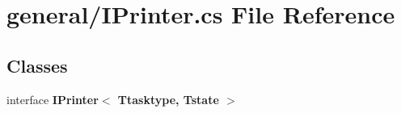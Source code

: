 \section{general/\-I\-Printer.cs File Reference}
\label{_i_printer_8cs}
\subsection*{Classes}
\begin{DoxyCompactItemize}
\item 
interface {\bf I\-Printer$<$ Ttasktype, Tstate $>$}
\end{DoxyCompactItemize}
